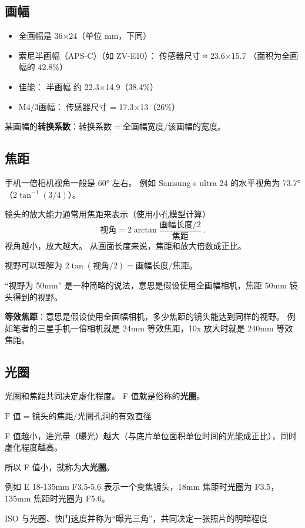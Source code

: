
\subsection{画幅}
\begin{itemize}
\item 全画幅是 36×24（单位 mm，下同）
\item 索尼半画幅（APS-C）（如 ZV-E10）： 传感器尺寸 ≈ 23.6×15.7 （面积为全画幅的 42.8\%）
\item 佳能： 半画幅 约 22.3×14.9（38.4\%）
\item M4/3画幅： 传感器尺寸 = 17.3×13（26\%）
\end{itemize}

某画幅的\textbf{转换系数}：$\text{转换系数} = \text{全画幅宽度}/\text{该画幅的宽度}$。

\subsection{焦距}
手机一倍相机视角一般是 60° 左右。 例如 Samsung s ultra 24 的水平视角为 73.7°（$2\tan^{-1}(3/4)$）。

镜头的放大能力通常用焦距来表示（使用小孔模型计算）
\begin{equation}
\text{视角} = 2\arctan{\frac{\text{画幅长度/2}}{\text{焦距}}}~.
\end{equation}
视角越小，放大越大。 从画面长度来说，焦距和放大倍数成正比。

视野可以理解为 $2\tan(\text{视角}/2) = \text{画幅长度}/{\text{焦距}}$。

“视野为 50mm” 是一种简略的说法，意思是假设使用全画幅相机，焦距 50mm 镜头得到的视野。

\textbf{等效焦距}：意思是假设使用全画幅相机，多少焦距的镜头能达到同样的视野。 例如笔者的三星手机一倍相机就是 24mm 等效焦距，10x 放大时就是 240mm 等效焦距。


\subsection{光圈}
光圈和焦距共同决定虚化程度。 F 值就是俗称的\textbf{光圈}。

$\text{F 值} = \text{镜头的焦距}/\text{光圈孔洞的有效直径}$

F 值越小，进光量（曝光）越大（与底片单位面积单位时间的光能成正比），同时虚化程度越高。

所以 F 值小，就称为\textbf{大光圈}。

例如 E 18-135mm F3.5-5.6 表示一个变焦镜头，18mm 焦距时光圈为 F3.5， 135mm 焦距时光圈为 F5.6。


ISO 与光圈、快门速度并称为“曝光三角”，共同决定一张照片的明暗程度


